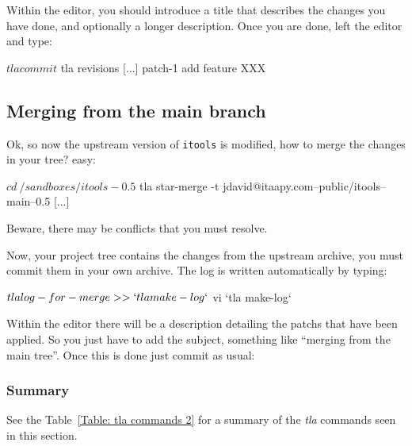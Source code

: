 Within the editor, you should introduce a title that describes the changes
you have done, and optionally a longer description. Once you are done,
left the editor and type:

\begin{code}
    $ tla commit
    $ tla revisions
    [...]
    patch-1
        add feature XXX
\end{code}


\subsection{Merging from the main branch}

Ok, so now the upstream version of {\tt itools} is modified, how to merge
the changes in your tree? easy:

\begin{code}
    $ cd ~/sandboxes/itools-0.5
    $ tla star-merge -t jdavid@itaapy.com--public/itools--main--0.5
    [...]
\end{code}

Beware, there may be conflicts that you must resolve.

Now, your project tree contains the changes from the upstream archive,
you must commit them in your own archive. The log is written automatically
by typing:

\begin{code}
    $ tla log-for-merge >> `tla make-log`
    $ vi `tla make-log`
\end{code}

Within the editor there will be a description detailing the patchs that
have been applied. So you just have to add the subject, something like
``merging from the main tree''. Once this is done just commit as usual:



\subsubsection{Summary}

See the Table~\ref{Table: tla commands 2} for a summary of the {\em tla}
commands seen in this section.

